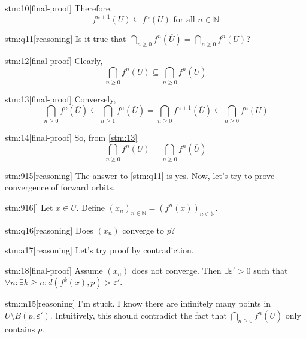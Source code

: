 \documentclass{article}
\begin{document}
\begin{stm}{stm:10}[final-proof]
Therefore, 
$$f^{n+1}(U) \subseteq f^n(U) \text{ for all } n \in \mathbb{N}$$
\end{stm}
    
\begin{stm}{stm:q11}[reasoning]
Is it true that $\bigcap_{n \ge 0} f^n(\overline{U}) = \bigcap_{n \ge 0} f^n(U)$?
\end{stm}

\begin{stm}{stm:12}[final-proof]
Clearly,
$$\bigcap_{n \ge 0} f^n(U) \subseteq \bigcap_{n \ge 0} f^n(\overline{U})$$
\end{stm}

\begin{stm}{stm:13}[final-proof]
Conversely, 
$$\bigcap_{n \ge 0} f^n(\overline{U}) \subseteq \bigcap_{n \ge 1} f^n(\overline{U}) = \bigcap_{n \ge 0} f^{n+1}(\overline{U}) \subseteq \bigcap_{n \ge 0} f^n(U)$$
\end{stm}

\begin{stm}{stm:14}[final-proof]
So, from \ref{stm:13}
$$\bigcap_{n \ge 0} f^n(U) = \bigcap_{n \ge 0} f^n(\overline{U})$$
\end{stm}

\begin{stm}{stm:915}[reasoning]
The answer to \ref{stm:q11} is yes. Now, let's try to prove convergence of forward orbits. 
\end{stm}

\begin{stm}{stm:916}[]
Let $x \in U$. Define $(x_n)_{n \in \mathbb{N}} = (f^n(x))_{n \in \mathbb{N}}$.
\end{stm}

\begin{stm}{stm:q16}[reasoning]
Does $(x_n)$ converge to $p$?
\end{stm}

\begin{stm}{stm:a17}[reasoning]
Let's try proof by contradiction. 
\end{stm}

\begin{stm}{stm:18}[final-proof]
Assume $(x_n)$ does not converge. Then $\exists \varepsilon' > 0$ such that $\forall n : \exists k \ge n : d(f^k(x), p) > \varepsilon'$.
\end{stm}

\begin{stm}{stm:m15}[reasoning]
I'm stuck. I know there are infinitely many points in $U \setminus B(p, \varepsilon')$. Intuitively, this should contradict the fact that $\bigcap_{n \ge 0} f^n(\overline{U})$ only contains $p$.
\end{stm}
\end{document}
